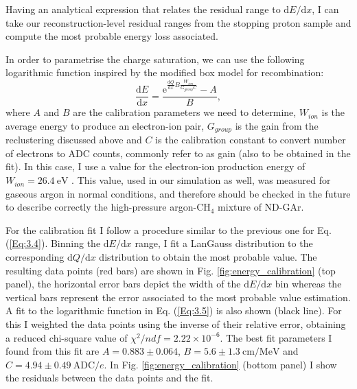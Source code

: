Having an analytical expression that relates the residual range to $\mathrm{d}E/\mathrm{d}x$, I can take our reconstruction-level residual ranges from the stopping proton sample and compute the most probable energy loss associated.

In order to parametrise the charge saturation, we can use the following logarithmic function inspired by the modified box model for recombination:
\begin{equation}\label{Eq:3.5}
	\frac{\mathrm{d}E}{\mathrm{d}x} = \frac{\mathrm{e}^{\frac{\mathrm{d}Q}{\mathrm{d}x}B\frac{W_{ion}}{G_{group}C}}-A}{B},
\end{equation}
where $A$ and $B$ are the calibration parameters we need to determine, $W_{ion}$ is the average energy to produce an electron-ion pair, $G_{group}$ is the gain from the reclustering discussed above and $C$ is the calibration constant to convert number of electrons to ADC counts, commonly refer to as gain (also to be obtained in the fit). In this case, I use a value for the electron-ion production energy of $W_{ion} = 26.4 \ \mathrm{eV}$ \cite{Aprile2008}. This value, used in our simulation as well, was measured for gaseous argon in normal conditions, and therefore should be checked in the future to describe correctly the high-pressure argon-$\mathrm{CH}_{4}$ mixture of ND-GAr.

For the calibration fit I follow a procedure similar to the previous one for Eq. (\ref{Eq:3.4}). Binning the $\mathrm{d}E/\mathrm{d}x$ range, I fit a LanGauss distribution to the corresponding $\mathrm{d}Q/\mathrm{d}x$ distribution to obtain the most probable value. The resulting data points (red bars) are shown in Fig. \ref{fig:energy_calibration} (top panel), the horizontal error bars depict the width of the $\mathrm{d}E/\mathrm{d}x$ bin whereas the vertical bars represent the error associated to the most probable value estimation. A fit to the logarithmic function in Eq. (\ref{Eq:3.5}) is also shown (black line). For this I weighted the data points using the inverse of their relative error, obtaining a reduced chi-square value of $\chi^{2}/ndf=2.22\times10^{-6}$. The best fit parameters I found from this fit are $A = 0.883 \pm 0.064$, $B=5.6\pm1.3~\mathrm{cm}/\mathrm{MeV}$ and $C = 4.94 \pm 0.49 \ \mathrm{ADC}/e$. In Fig. \ref{fig:energy_calibration} (bottom panel) I show the residuals between the data points and the fit.

